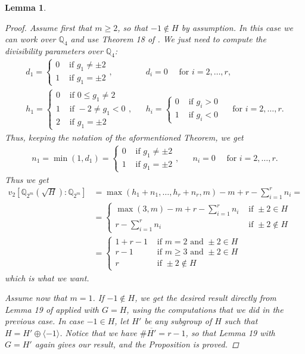 \documentclass[10pt,a4paper]{article}
\newtheorem{lemma}{Lemma}
\theoremstyle{definition}
\begin{document}
\begin{lemma}
\begin{proof}
Assume first that $m\geq 2$, so that $-1\not\in H$ by assumption. In this case we can work over $\mathbb Q_4$ and use Theorem 18 of \cite{DebryPerucca}. We just need to compute the divisibility parameters over $\mathbb{Q}_4$:
\begin{align*}
d_1=\begin{cases}
0&\text{ if }g_1\neq\pm2\\
1&\text{ if }g_1=\pm2
\end{cases},
&&
d_i=0
\quad \text{ for $i=2,\dots, r$},\\
h_1=\begin{cases}
0&\text{ if } 0\leq g_1\neq2\\
1&\text{ if } -2\neq g_1<0\\
2&\text{ if } g_1=\pm 2
\end{cases}, &&
h_i=\begin{cases}
0&\text{ if }g_i>0\\
1&\text{ if }g_i<0
\end{cases}
\quad \text{ for $i=2,\dots, r$}.
\end{align*}
Thus, keeping the notation of the aformentioned Theorem, we get
\begin{align*}
n_1=\min(1,d_1)=\begin{cases}
0&\text{ if }g_1\neq\pm2\\
1&\text{ if }g_1=\pm2
\end{cases},&& n_i=0\quad \text{ for $i=2,\dots, r$}.
\end{align*}
Thus we get
\begin{align*}
v_2\left[\mathbb{Q}_{2^m}(\sqrt{H}):\mathbb Q_{2^m}\right]&=\max(h_1+n_1,\dots, h_r+n_r,m)-m+r-\sum_{i=1}^rn_i=\\
&=\begin{cases}
\max(3,m)-m+r-\sum_{i=1}^rn_i&\text{ if }\pm2\in H\\
r-\sum_{i=1}^rn_i&\text{ if }\pm2\not \in H
\end{cases}\\
&=\begin{cases}
1+r-1&\text{ if }m=2\text{ and }\pm2\in H\\
r-1&\text{ if }m\geq3\text{ and }\pm2\in H\\
r&\text{ if }\pm2\not\in H
\end{cases}
\end{align*}
which is what we want.

Assume now that $m=1$. If $-1\not\in H$, we get the desired result directly from Lemma 19 of \cite{DebryPerucca} applied with $G=H$, using the computations that we did in the previous case. In case $-1\in H$, let $H'$ be any subgroup of $H$ such that $H=H'\oplus\langle-1\rangle$. Notice that we have $\#\overline {H'}=r-1$, so that Lemma 19 with $G=H'$ again gives our result, and the Proposition is proved.
\end{proof}
\end{lemma}
\end{document}
